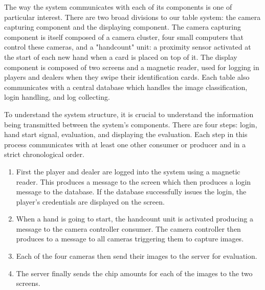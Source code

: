 \documentclass[12pt]{report}
\begin{document}
The way the system communicates with each of its components is one of particular interest. There are two broad divisions to our table system: the camera capturing component and the displaying component. The camera capturing component is itself composed of a camera cluster, four small computers that control these cameras, and a "handcount" unit: a proximity sensor activated at the start of each new hand when a card is placed on top of it. The display component is composed of two screens and a magnetic reader, used for logging in players and dealers when they swipe their identification cards. Each table also communicates with a central database which handles the image classification, login handling, and log collecting.

To understand the system structure, it is crucial to understand the information being transmitted between the system's components. There are four steps: login, hand start signal, evaluation, and displaying the evaluation. Each step in this process communicates with at least one other consumer or producer and in a strict chronological order.

\begin{enumerate}
  \item First the player and dealer are logged into the system using a magnetic reader. This produces a message to the screen which then produces a login message to the database. If the database successfully issues the login, the player's credentials are displayed on the screen.
  
  \item When a hand is going to start, the handcount unit is activated producing a message to the camera controller consumer. The camera controller then produces to a message to all cameras triggering them to capture images.
  
  \item Each of the four cameras then send their images to the server for evaluation.
  
  \item The server finally sends the chip amounts for each of the images to the two screens.

\end{enumerate}
\end{document}
